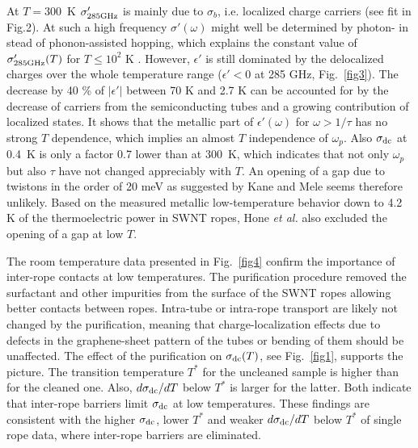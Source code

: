 \begin{multicols}{2}
At $T=300$~K $\sigma'_{\rm 285 GHz}$ is mainly due to $\sigma_b$, i.e.
localized charge carriers (see fit in Fig.2). At such a high frequency
$\sigma'(\omega)$ might well be determined by photon- in stead of
phonon-assisted hopping\cite{Boettger85,Reedijk98}, which explains the
constant value of $\sigma'_{\rm 285 GHz}(T)$ for $T \le 10^2$ K .
However, $\epsilon'$ is still dominated by the delocalized charges over the
whole temperature range ($\epsilon'<0$ at 285 GHz, Fig.~\ref{fig3}). The
decrease by 40 \% of $|\epsilon'|$ between 70 K and 2.7 K can be accounted
for by the decrease of carriers from the semiconducting tubes and a growing
contribution of localized states. It shows that the metallic part of
$\epsilon'(\omega)$ for $\omega>1/\tau$ has no strong $T$ dependence, which
implies an almost $T$ independence of $\omega_p$.  Also $\sigma_{\rm dc}$
at 0.4~K is only a factor 0.7 lower than at 300~K, which indicates
that not only $\omega_p$ but also $\tau$ have not changed appreciably with
$T$. An opening of a gap due to twistons in the order of 20 meV as suggested
by Kane and Mele\cite{Kane97} seems therefore unlikely.  Based on the
measured metallic low-temperature behavior down to 4.2 K of the
thermoelectric power in SWNT ropes, Hone {\it et al.}\cite{Hone98} also
excluded the opening of a gap at low $T$\cite{n1}.

The room temperature data presented in Fig.~\ref{fig4} confirm the importance
of inter-rope contacts at low temperatures. The purification procedure
removed the surfactant and other impurities from the surface of the
SWNT ropes allowing better contacts between ropes. Intra-tube or
intra-rope transport are likely not changed by the purification,
meaning that charge-localization effects due to defects in the
graphene-sheet pattern of the tubes or bending of them should be
unaffected. The effect of the purification on $\sigma_{\rm dc}(T)$, see
Fig.~\ref{fig1}, supports the picture.  The transition temperature $T^*$ for
the uncleaned sample is higher than for the cleaned one. Also, $d\sigma_{\rm
dc}/ dT$ below $T^*$ is larger for the latter. Both indicate that inter-rope
barriers limit $\sigma_{\rm dc}$ at low temperatures. These findings are
consistent with the higher $\sigma_{\rm dc}$, lower $T^*$ and
weaker $d\sigma_{\rm dc}/ dT$ below $T^*$\cite{Fischer97} of
single rope data, where inter-rope barriers are eliminated.


\end{multicols}
